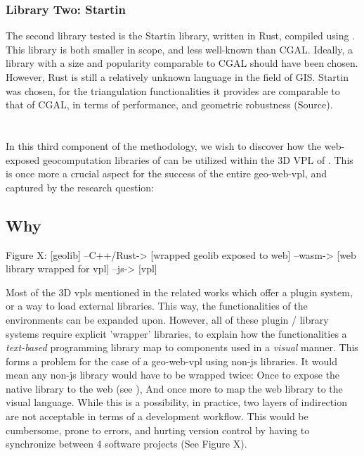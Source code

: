 \subsubsection*{Library Two: Startin}
The second library tested is the Startin library, written in Rust, compiled using .  
This library is both smaller in scope, and less well-known than CGAL. 
Ideally, a library with a size and popularity comparable to CGAL should have been chosen.
However, Rust is still a relatively unknown language in the field of GIS. 
Startin was chosen, for the triangulation functionalities it provides are comparable to that of CGAL, in terms of performance, and geometric robustness (Source). 


\section{\mySubRQThreeTitle} 
\label{sec:method-three}
In this third component of the methodology, we wish to discover how the web-exposed geocomputation libraries of  can be utilized within the 3D VPL of . 
This is once more a crucial aspect for the success of the entire \ac*{geo-web-vpl}, 
and captured by the research question: \mySubRQThree


\subsection{Why}

\begin{note}
Figure X: [geolib] --C++/Rust-> [wrapped geolib exposed to web] --wasm-> [web library wrapped for vpl] --js-> [vpl]
\end{note}

Most of the 3D vpls mentioned in the related works which offer a plugin system, or a way to load external libraries.
This way, the functionalities of the environments can be expanded upon.
However, all of these plugin / library systems require explicit 'wrapper' libraries, to explain how the functionalities a \emph{text-based} programming library map to components used in a \emph{visual} manner.
This forms a problem for the case of a \ac{geo-web-vpl} using non-js libraries. 
It would mean any non-js library would have to be wrapped twice: 
Once to expose the native library to the web (see ),
And once more to map the web library to the visual language. 
While this is a possibility, in practice, two layers of indirection are not acceptable in terms of a development workflow.
This would be cumbersome, prone to errors, and hurting version control by having to synchronize between 4 software projects (See Figure X). 

